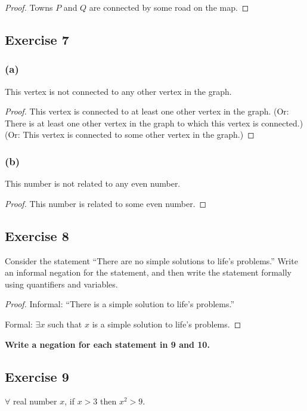 \documentclass[14pt]{extarticle}
\newcommand{\fa}{\forall}
\newcommand{\te}{\exists}
\begin{document}
\begin{proof}
Towns $P$ and $Q$ are connected by some road on the map.
\end{proof}

\subsection{Exercise 7}

\subsubsection{(a)}
This vertex is not connected to any other vertex in the graph.

\begin{proof}
This vertex is connected to at least one other vertex in the graph. (Or: There is at least one other vertex in the graph to which this vertex is connected.) (Or: This vertex is connected to some other vertex in the graph.)
\end{proof}

\subsubsection{(b)}
This number is not related to any even number.

\begin{proof}
This number is related to some even number.
\end{proof}

\subsection{Exercise 8}
Consider the statement “There are no simple solutions to life’s problems.” Write an informal negation for the statement, and then write the statement formally using quantifiers and variables.

\begin{proof}
Informal: “There is a simple solution to life’s problems.”

Formal: $\te x$ such that $x$ is a simple solution to life's problems.
\end{proof}

{\bf \color{cyan}Write a negation for each statement in 9 and 10.}

\subsection{Exercise 9}
$\fa$ real number $x$, if $x > 3$ then $x^2 > 9$.
\end{document}

